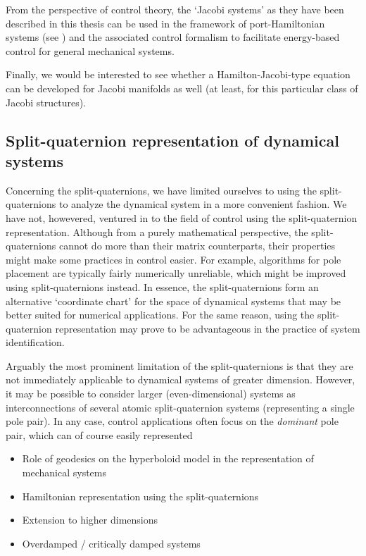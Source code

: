 From the perspective of control theory, the `Jacobi systems' as they have been described in this thesis can be used in the framework of port-Hamiltonian systems (see \citet{VanDerSchaft2006}) and the associated control formalism to facilitate energy-based control for general mechanical systems.

Finally, we would be interested to see whether a Hamilton-Jacobi-type equation can be developed for Jacobi manifolds as well (at least, for this particular class of Jacobi structures).

\subsection*{Split-quaternion representation of dynamical systems}
Concerning the split-quaternions, we have limited ourselves to using the split-quaternions to analyze the dynamical system in a more convenient fashion. We have not, howevered, ventured in to the field of control using the split-quaternion representation. Although from a purely mathematical perspective, the split-quaternions cannot do more than their matrix counterparts, their properties might make some practices in control easier. For example, algorithms for pole placement are typically fairly numerically unreliable, which might be improved using split-quaternions instead. In essence, the split-quaternions form an alternative `coordinate chart' for the space of dynamical systems that may be better suited for numerical applications. For the same reason, using the split-quaternion representation may prove to be advantageous in the practice of system identification.

Arguably the most prominent limitation of the split-quaternions is that they are not immediately applicable to dynamical systems of greater dimension. However, it may be possible to consider larger (even-dimensional) systems as interconnections of several atomic split-quaternion systems (representing a single pole pair). In any case, control applications often focus on the \emph{dominant} pole pair, which can of course easily represented 

\begin{itemize}
    \item Role of geodesics on the hyperboloid model in the representation of mechanical systems
    \item Hamiltonian representation using the split-quaternions
    \item Extension to higher dimensions
    \item Overdamped / critically damped systems
\end{itemize}

